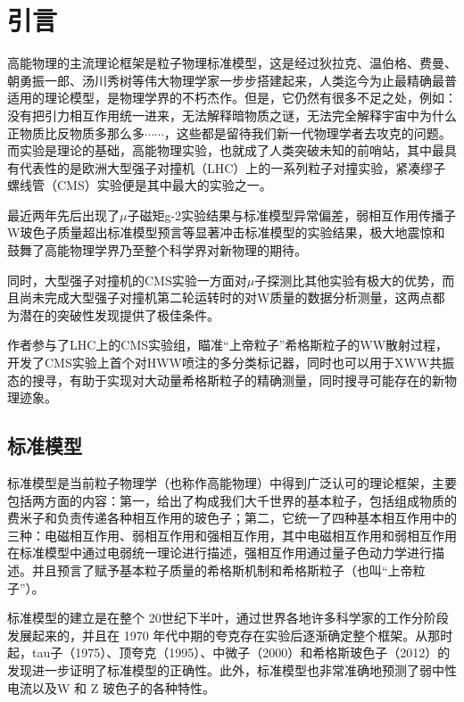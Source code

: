 \chapter{引言}
\label{chap1}
\fontsize{12bp}{14.4pt}

高能物理的主流理论框架是粒子物理标准模型，这是经过狄拉克、温伯格、费曼、朝勇振一郎、汤川秀树等伟大物理学家一步步搭建起来，人类迄今为止最精确最普适用的理论模型，是物理学界的不朽杰作。但是，它仍然有很多不足之处，例如：没有把引力相互作用统一进来，无法解释暗物质之谜，无法完全解释宇宙中为什么正物质比反物质多那么多$\cdots\cdots$，这些都是留待我们新一代物理学者去攻克的问题。而实验是理论的基础，高能物理实验，也就成了人类突破未知的前哨站，其中最具有代表性的是欧洲大型强子对撞机（LHC）上的一系列粒子对撞实验，紧凑缪子螺线管（CMS）实验便是其中最大的实验之一。

最近两年先后出现了$\mu$子磁矩g-2实验结果与标准模型异常偏差\cite{muong-2}，弱相互作用传播子W玻色子质量超出标准模型预言\cite{Wmass}等显著冲击标准模型的实验结果，极大地震惊和鼓舞了高能物理学界乃至整个科学界对新物理的期待。

同时，大型强子对撞机的CMS实验一方面对$\mu$子探测比其他实验有极大的优势，而且尚未完成大型强子对撞机第二轮运转时的对W质量的数据分析测量，这两点都为潜在的突破性发现提供了极佳条件。

作者参与了LHC上的CMS实验组，瞄准“上帝粒子”希格斯粒子的WW散射过程，开发了CMS实验上首个对HWW喷注的多分类标记器，同时也可以用于XWW共振态的搜寻，有助于实现对大动量希格斯粒子的精确测量，同时搜寻可能存在的新物理迹象。

\section{标准模型}
标准模型是当前粒子物理学（也称作高能物理）中得到广泛认可的理论框架，主要包括两方面的内容：第一，给出了构成我们大千世界的基本粒子，包括组成物质的费米子和负责传递各种相互作用的玻色子；第二，它统一了四种基本相互作用中的三种：电磁相互作用、弱相互作用和强相互作用，其中电磁相互作用和弱相互作用在标准模型中通过电弱统一理论进行描述，强相互作用通过量子色动力学进行描述。并且预言了赋予基本粒子质量的希格斯机制和希格斯粒子（也叫“上帝粒子”）。

标准模型的建立是在整个 20世纪下半叶，通过世界各地许多科学家的工作分阶段发展起来的，并且在 1970 年代中期的夸克存在实验后逐渐确定整个框架。从那时起，tau子（1975）、顶夸克（1995）、中微子（2000）和希格斯玻色子（2012）的发现进一步证明了标准模型的正确性。此外，标准模型也非常准确地预测了弱中性电流以及W 和 Z 玻色子的各种特性。
